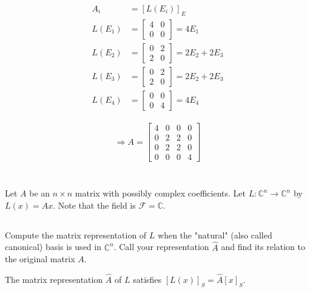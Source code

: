 \documentclass{article}
\theoremstyle{definition} %
\begin{document}
\begin{align*}
    A_i &= [L(E_i)]_E\\
    L(E_1) &= 
    \begin{bmatrix}
        4 & 0\\
        0 & 0
    \end{bmatrix}
    = 4 E_1\\
    L(E_2) &= 
    \begin{bmatrix}
        0 & 2\\
        2 & 0
    \end{bmatrix}
    = 2E_2 + 2E_3\\
    L(E_3) &= 
    \begin{bmatrix}
        0 & 2\\
        2 & 0
    \end{bmatrix}
    = 2E_2 + 2E_3\\
    L(E_4) &= 
    \begin{bmatrix}
        0 & 0\\
        0 & 4
    \end{bmatrix}
    = 4 E_4
\end{align*}

\begin{align*}
    \Rightarrow
    A = 
    \begin{bmatrix}
        4 & 0 & 0 & 0\\
        0 & 2 & 2 & 0\\
        0 & 2 & 2 & 0\\
        0 & 0 & 0 & 4
    \end{bmatrix}
\end{align*}


\section{}
Let $A$ be an $n \times n$ matrix with possibly complex coefficients. Let $L: \mathbb{C}^n \rightarrow \mathbb{C}^n$ by $L(x)=A x$. Note that the field is $\mathcal{F}=\mathbb{C}$.

\subsection{}
Compute the matrix representation of $L$ when the "natural" (also called canonical) basis is used in $\mathbb{C}^n$. Call your representation $\hat{A}$ and find its relation to the original matrix $A$.

The matrix representation $\hat A$ of $L$ satisfies $[L(x)]_S = \hat{A}[x]_S$.
\end{document}
